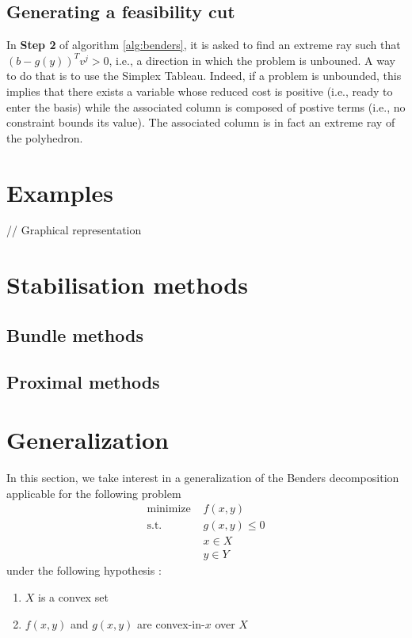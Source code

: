 \subsection{Generating a feasibility cut}

In \textbf{Step 2} of algorithm \ref{alg:benders}, it is asked to find an extreme ray such that $(b-g(y))^Tv^j > 0$, i.e., a direction in which the problem is unbouned. A way to do that is to use the Simplex Tableau. Indeed, if a problem is unbounded, this implies that there exists a variable whose reduced cost is positive (i.e., ready to enter the basis) while the associated column is composed of postive terms (i.e., no constraint bounds its value). The associated column is in fact an extreme ray of the polyhedron. 

\section{Examples}

// Graphical representation

\section{Stabilisation methods}

\subsection{Bundle methods}

\subsection{Proximal methods}

\section{Generalization}

In this section, we take interest in a generalization of the Benders decomposition applicable for the following problem
\begin{align}
    \textrm{minimize } & f(x,y) \\
    \textrm{s.t. } & g(x,y) \le 0\\
    & x\in X\\
    & y\in Y
\end{align} under the following hypothesis :
\begin{enumerate}[label=($\roman*$)]
    \item $X$ is a convex set
    \item $f(x,y)$ and $g(x,y)$ are convex-in-$x$ over $X$
\end{enumerate}

